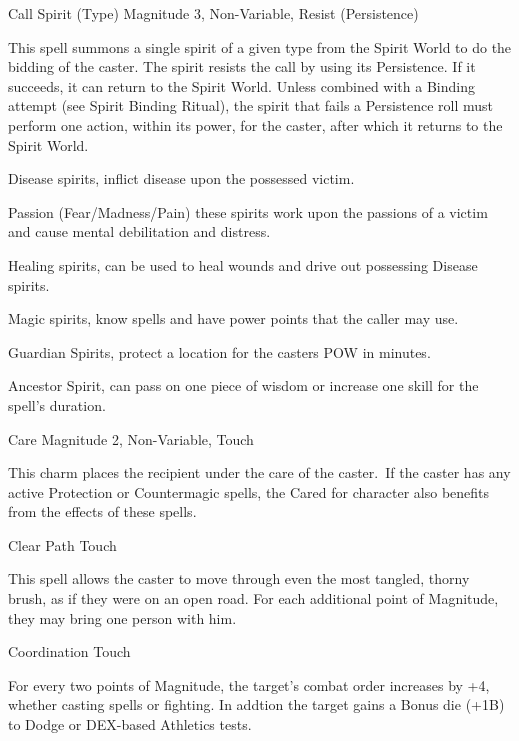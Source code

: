 \begin{rpg-spell}
{Call Spirit (Type)}
{Magnitude 3, Non-Variable, Resist (Persistence)}

This spell summons a single spirit of a given type from the Spirit World to do the bidding of the caster. The spirit resists the call by using its Persistence. If it succeeds, it can return to the Spirit World. Unless combined with a Binding attempt (see Spirit Binding Ritual), the spirit that fails a Persistence roll must perform one action, within its power, for the caster, after which it returns to the Spirit World.

\begin{rpg-list}
\item Disease spirits, inflict disease upon the possessed victim.
\item Passion (Fear/Madness/Pain) these spirits work upon the passions of a victim and cause mental debilitation and distress.
\item Healing spirits, can be used to heal wounds and drive out possessing Disease spirits.
\item Magic spirits, know spells and have power points that the caller may use.
\item Guardian Spirits, protect a location for the casters POW in minutes.
\item Ancestor Spirit, can pass on one piece of wisdom or increase one skill for the spell's duration.
\end{rpg-list}
\end{rpg-spell}

 
\begin{rpg-spell}
{Care}
{Magnitude 2, Non-Variable, Touch}

This charm places the recipient under the care of the caster. If the caster has any active Protection or Countermagic spells, the Cared for character also benefits from the effects of these spells.
\end{rpg-spell}

\begin{rpg-spell}
{Clear Path}
{Touch}

This spell allows the caster to move through even the most tangled, thorny brush, as if they were on an open road. For each additional point of Magnitude, they may bring one person with him. 
\end{rpg-spell}


\begin{rpg-spell}
{Coordination}
{Touch}

For every two points of Magnitude, the target’s combat order increases by +4, whether casting spells or fighting. In addtion the target gains a Bonus die (+1B) to Dodge or DEX-based Athletics tests.
\end{rpg-spell}



